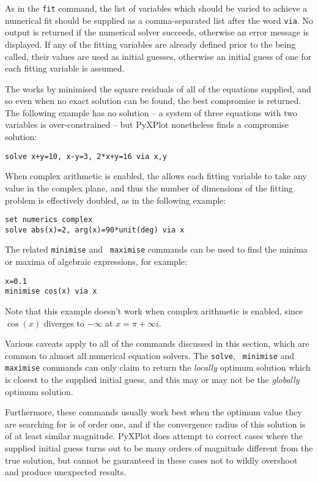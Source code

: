 \noindent As in the {\tt fit} command, the list of variables which should be
varied to achieve a numerical fit should be supplied as a comma-separated list
after the word {\tt via}. No output is returned if the numerical solver
succeeds, otherwise an error message is displayed. If any of the fitting
variables are already defined prior to the  being called, their
values are used as initial guesses, otherwise an initial guess of one for each
fitting variable is assumed.

The  works by minimised the square residuals of all of the
equations supplied, and so even when no exact solution can be found, the best
compromise is returned. The following example has no solution -- a system of
three equations with two variables is over-constrained -- but PyXPlot
nonetheless finds a compromise solution:

\begin{verbatim}
solve x+y=10, x-y=3, 2*x+y=16 via x,y
\end{verbatim}

When complex arithmetic is enabled, the  allows each fitting
variable to take any value in the complex plane, and thus the number of
dimensions of the fitting problem is effectively doubled, as in the following
example:

\begin{verbatim}
set numerics complex
solve abs(x)=2, arg(x)=90*unit(deg) via x
\end{verbatim}

The related  {\tt minimise} and {\tt
maximise} commands can be used to find the minima or maxima of algebraic
expressions, for example:

\begin{verbatim}
x=0.1
minimise cos(x) via x
\end{verbatim}

\noindent Note that this example doesn't work when complex arithmetic is
enabled, since $\cos(x)$ diverges to $-\infty$ at $x=\pi+\infty i$.

Various caveats apply to all of the commands discussed in this section, which
are common to almost all numerical equation solvers. The {\tt solve}, {\tt
minimise} and {\tt maximise} commands can only claim to return the {\it
locally} optimum solution which is closest to the supplied initial guess, and
this may or may not be the {\it globally} optimum solution.

Furthermore, these commands usually work best when the optimum value they are
searching for is of order one, and if the convergence radius of this solution
is of at least similar magnitude. PyXPlot does attempt to correct cases where
the supplied initial guess turns out to be many orders of magnitude different
from the true solution, but cannot be gauranteed in these cases not to wildly
overshoot and produce unexpected results.

